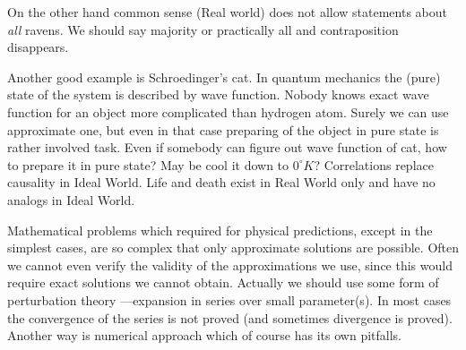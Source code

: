 On the other hand common sense (Real world) does not allow statements about 
{\em all} ravens. We should say majority or practically all 
and  contraposition  disappears.

Another good example is Schroedinger's cat. In quantum mechanics the (pure) state of the system is described 
by wave function. Nobody knows exact wave function for an object more complicated than hydrogen atom. 
Surely we can use approximate one, but even in that case preparing of the object in pure state
is rather involved task.  Even if somebody can figure out wave function of cat, how to prepare it
in pure state? May be cool it down to $0^\circ K$? Correlations replace causality in Ideal World.
 Life and death exist in Real World only and have no analogs in Ideal World.

Mathematical problems which required for physical predictions, except in the simplest cases, are so complex that only approximate solutions are possible. 
Often we cannot even verify the validity of the approximations we use,
since this would require exact solutions we cannot obtain. Actually we should 
use some form of perturbation theory ---expansion in series over small parameter(s). 
In most cases the convergence of the series is not proved (and sometimes divergence is proved). 
Another way is numerical approach which of course has its own pitfalls.


